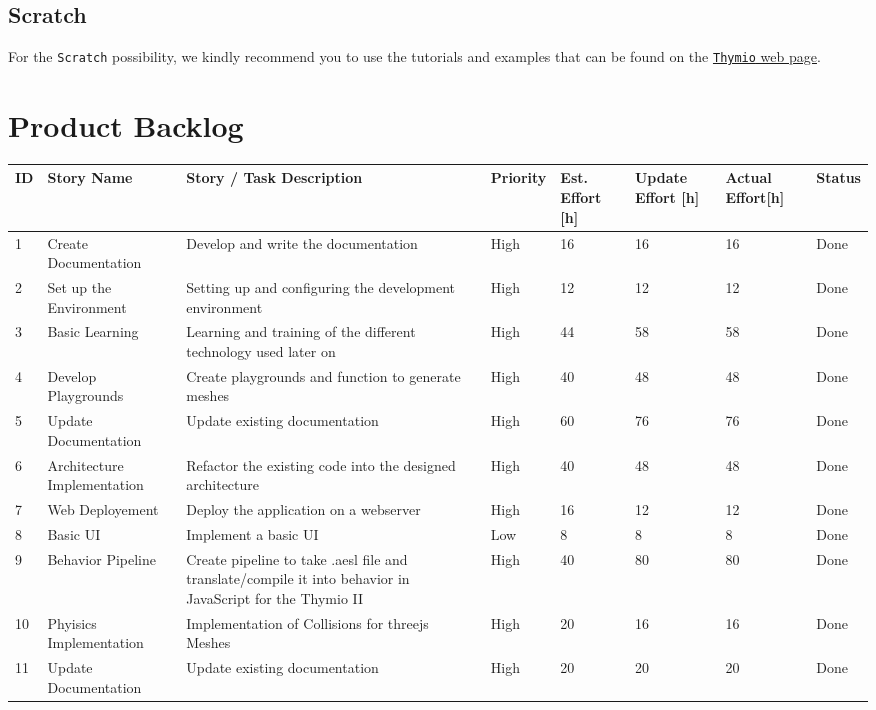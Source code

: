 \documentclass{scrreprt}
\begin{document}
\section{Scratch}

For the \texttt{Scratch} possibility, we kindly recommend you to use the tutorials and examples that can be found on the \href{https://www.thymio.org/program/scratch/}{\texttt{Thymio} web page}.

\chapter{Product Backlog}
\begin{longtable}{p{5mm}|p{2cm}|p{4cm}|p{1cm}|p{1cm}|p{1cm}|p{1cm}|p{15mm}}
  ID                     & Story Name & Story / Task Description & Priority & Est. Effort {[}h{]} & Update Effort {[}h{]} & Actual Effort{[}h{]} & Status                \\ \hline
  1 & Create Documentation & Develop and write the documentation & High & 16 & 16 & 16 & Done \\ 
  2 & Set up the Environment & Setting up and configuring the development environment & High & 12 & 12 & 12 & Done \\ 
  3 & Basic Learning & Learning and training of the different technology used later on & High & 44 & 58 & 58 & Done \\ 
  4 & Develop Playgrounds & Create playgrounds and function to generate meshes & High & 40 & 48 & 48 & Done \\ 
  5 & Update Documentation & Update existing documentation & High & 60 & 76 & 76 & Done \\
  6 & Architecture Implementation & Refactor the existing code into the designed architecture & High & 40 & 48 & 48 & Done\\ 
  7 & Web Deployement & Deploy the application on a webserver & High & 16 & 12 & 12 & Done \\ 
  8 & Basic UI & Implement a basic UI & Low & 8 & 8 & 8 & Done \\ 
  9 & Behavior Pipeline & Create pipeline to take .aesl file and translate/compile it into behavior in JavaScript for the Thymio II & High & 40 & 80 & 80 & Done \\ 
  10 & Phyisics Implementation & Implementation of Collisions for threejs Meshes & High & 20 & 16 & 16 & Done \\ 
  11 & Update Documentation & Update existing documentation & High & 20 & 20 & 20 & Done \\ 

\end{longtable}
\end{document}
